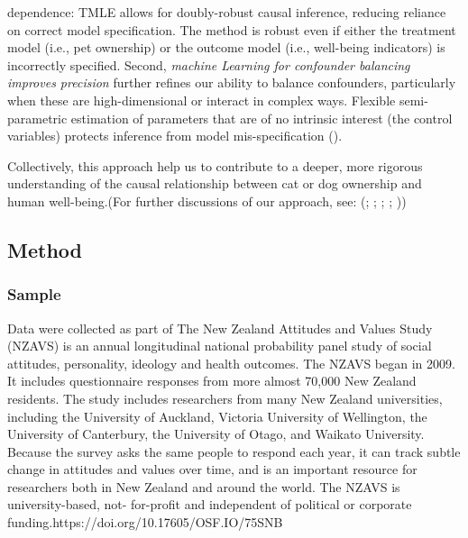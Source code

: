 \documentclass[
  singlecolumn]{article}
\begin{document}
\begin{enumerate}
{  dependence}: TMLE allows for doubly-robust causal inference, reducing
  reliance on correct model specification. The method is robust even if
  either the treatment model (i.e., pet ownership) or the outcome model
  (i.e., well-being indicators) is incorrectly specified. Second,
  \emph{machine Learning for confounder balancing improves precision}
  further refines our ability to balance confounders, particularly when
  these are high-dimensional or interact in complex ways. Flexible
  semi-parametric estimation of parameters that are of no intrinsic
  interest (the control variables) protects inference from model
  mis-specification ().
\end{enumerate}

Collectively, this approach help us to contribute to a deeper, more
rigorous understanding of the causal relationship between cat or dog
ownership and human well-being.(For further discussions of our approach,
see: (;
;
;
;
))

\subsection{Method}\label{method}

\subsubsection{Sample}\label{sample}

Data were collected as part of The New Zealand Attitudes and Values
Study (NZAVS) is an annual longitudinal national probability panel study
of social attitudes, personality, ideology and health outcomes. The
NZAVS began in 2009. It includes questionnaire responses from more
almost 70,000 New Zealand residents. The study includes researchers from
many New Zealand universities, including the University of Auckland,
Victoria University of Wellington, the University of Canterbury, the
University of Otago, and Waikato University. Because the survey asks the
same people to respond each year, it can track subtle change in
attitudes and values over time, and is an important resource for
researchers both in New Zealand and around the world. The NZAVS is
university-based, not- for-profit and independent of political or
corporate funding.https://doi.org/10.17605/OSF.IO/75SNB
\end{document}
